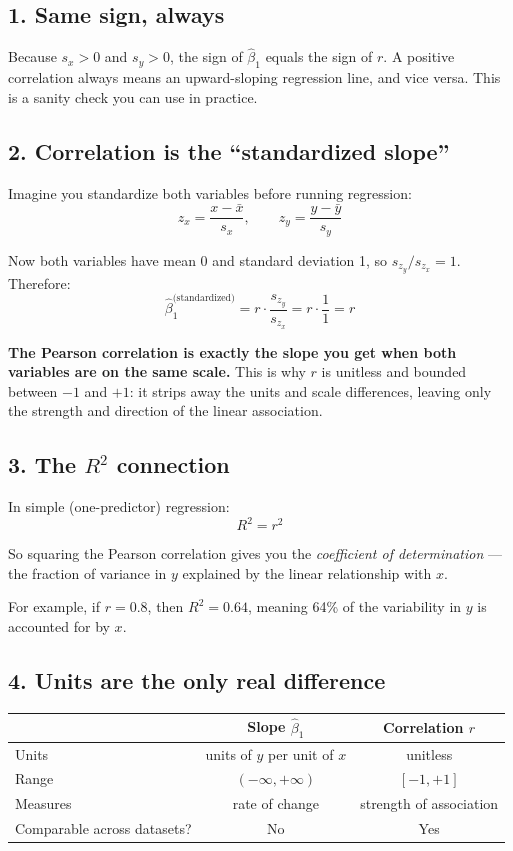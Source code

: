 \documentclass[11pt,a4paper]{article}
\begin{document}
\subsection{1. Same sign, always}

Because $s_x > 0$ and $s_y > 0$, the sign of $\hat{\beta}_1$ equals the sign
of $r$. A positive correlation always means an upward-sloping regression line,
and vice versa. This is a sanity check you can use in practice.

\subsection{2. Correlation is the ``standardized slope''}

Imagine you standardize both variables before running regression:
\[
z_x = \frac{x - \bar{x}}{s_x}, \qquad
z_y = \frac{y - \bar{y}}{s_y}
\]

Now both variables have mean 0 and standard deviation 1, so
$s_{z_y}/s_{z_x} = 1$. Therefore:
\[
\hat{\beta}_1^{\text{(standardized)}}
= r \cdot \frac{s_{z_y}}{s_{z_x}}
= r \cdot \frac{1}{1}
= r
\]

\textbf{The Pearson correlation is exactly the slope you get when both
variables are on the same scale.} This is why $r$ is unitless and bounded
between $-1$ and $+1$: it strips away the units and scale differences,
leaving only the strength and direction of the linear association.

\subsection{3. The $R^2$ connection}

In simple (one-predictor) regression:
\[
R^2 = r^2
\]

So squaring the Pearson correlation gives you the \emph{coefficient of
determination} --- the fraction of variance in $y$ explained by the linear
relationship with $x$.

For example, if $r = 0.8$, then $R^2 = 0.64$, meaning 64\% of the
variability in $y$ is accounted for by $x$.

\subsection{4. Units are the only real difference}

\begin{center}
\begin{tabular}{lcc}
\hline
& \textbf{Slope} $\hat{\beta}_1$ & \textbf{Correlation} $r$ \\
\hline
Units        & units of $y$ per unit of $x$ & unitless \\
Range        & $(-\infty, +\infty)$ & $[-1, +1]$ \\
Measures     & rate of change & strength of association \\
Comparable across datasets? & No & Yes \\
\hline
\end{tabular}
\end{center}
\end{document}
